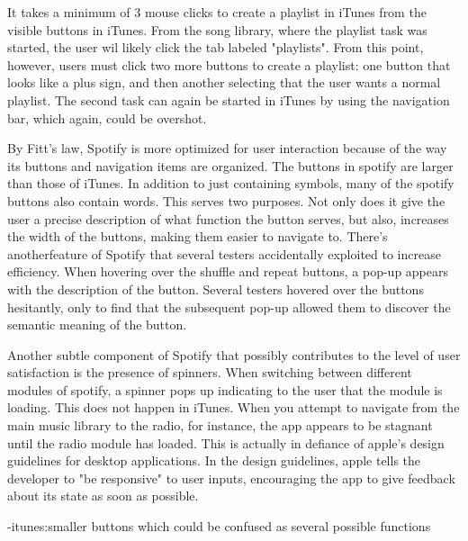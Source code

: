 \documentclass[12pt]{report}
\begin{document}
It takes a minimum of 3 mouse clicks to create a playlist in iTunes from the visible buttons in iTunes. From the song library, where the playlist task was started, the user wil likely click the tab labeled "playlists". From this point, however, users must click two more buttons to create a playlist: one button that looks like a plus sign, and then another selecting that the user wants a normal playlist. The second task can again be started in iTunes by using the navigation bar, which again, could be overshot.

By Fitt's law, Spotify is more optimized for user interaction because of the way its buttons and navigation items are organized. The buttons in spotify are larger than those of iTunes. In addition to just containing symbols, many of the spotify buttons also contain words. This serves two purposes. Not only does it give the user a precise description of what function the button serves, but also, increases the width of the buttons, making them easier to navigate to. There's anotherfeature of Spotify that several testers accidentally exploited to increase efficiency. When hovering over the shuffle and repeat buttons, a pop-up appears with the description of the button. Several testers hovered over the buttons hesitantly, only to find that the subsequent pop-up allowed them to discover the semantic meaning of the button.

Another subtle component of Spotify that possibly contributes to the level of user satisfaction is the presence of spinners. When switching between different modules of spotify, a spinner pops up indicating to the user that the module is loading. This does not happen in iTunes. When you attempt to navigate from the main music library to the radio, for instance, the app appears to be stagnant until the radio module has loaded. This is actually in defiance of apple's design guidelines  for desktop applications. In the design guidelines, apple tells the developer to  "be responsive" to user inputs, encouraging the app to give feedback about its state as soon as possible.


-itunes:smaller buttons which could be confused as several possible functions
\end{document}

